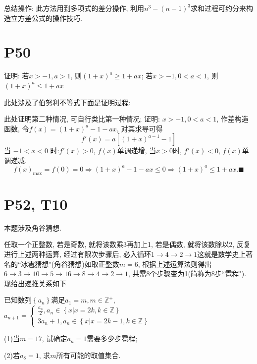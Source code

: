 \documentclass{book}
\begin{document}
    总结操作: 此方法用到多项式的\textcolor[rgb]{0.75,0.17,0.22}{差分}操作, 利用$n^3-(n-1)^3$求和过程可约分来构造立方差公式的操作技巧.
    \section{\textcolor[rgb]{0.11,0.65,0.52}{P50}}
    \begin{boxB}
        证明: 若$x>-1,a>1$, 则$\displaystyle \left( 1+x \right)^a\geqslant 1+ax$; 若$x>-1,0<a<1$, 则$\displaystyle \left( 1+x \right)^a\leqslant 1+ax$
    \end{boxB}
    此处涉及了\textcolor[rgb]{0.38,0.11,0.2}{伯努利不等式}下面是证明过程:

    此处证明第二种情况, 可自行类比第一种情况; 证明: $x>-1,0<a<1$, \textcolor[rgb]{0.75,0.17,0.22}{作差构造函数}, 令$\displaystyle f(x)=\left( 1+x \right)^a-1-ax$, 对其求导可得$$f'(x)=a\left[ \left( 1+x \right)^{a-1}-1 \right]$$
    当 $-1<x<0$ 时:$f'(x)>0$, $f(x)$单调递增, 当$x>0$时, $f'(x)<0$, $f(x)$单调递减.
    $$f(x)_{\max }=f(0)=0\Longrightarrow \left( 1+x \right)^a-1-ax\leqslant 0\Longrightarrow \left( 1+x \right)^a\leqslant 1+ax.\blacksquare$$

    \section{\textcolor[rgb]{0.11,0.65,0.52}{P52, T10}}

    本题涉及\textcolor[rgb]{0.38,0.11,0.2}{角谷猜想}.

    任取一个正整数, 若是奇数, 就将该数乘3再加上1, 若是偶数, 就将该数除以2, 反复进行上述两种运算, 经过有限次步骤后, 必入循环$1\rightarrow 4\rightarrow 2\rightarrow 1$这就是数学史上著名的``冰雹猜想"(角谷猜想)如取正整数$m=6$, 根据上述运算法则得出$6\rightarrow 3\rightarrow 10\rightarrow 5\rightarrow 16\rightarrow 8\rightarrow 4\rightarrow 2\rightarrow 1$, 共需8个步骤变为1(简称为8步``雹程"). 现给出递推关系如下

    已知数列$\left\{ a_n \right\}$满足$a_1=m,m\in \mathbb{Z}^+$,$\displaystyle a_{n+1}=\left\{\begin{matrix}
    \displaystyle \frac{a_n}{2},a_n\in\left \{ x|x=2k,k\in \mathbb{Z}  \right \} \\
    3a_n+1, a_n\in\left \{ x|x=2k-1,k\in \mathbb{Z}  \right \}
\end{matrix}\right. $

    (1)当$m=17$, 试确定$a_n=1$需要多少步雹程;

    (2)若$a_8=1$, 求$m$所有可能的取值集合.
\end{document}
